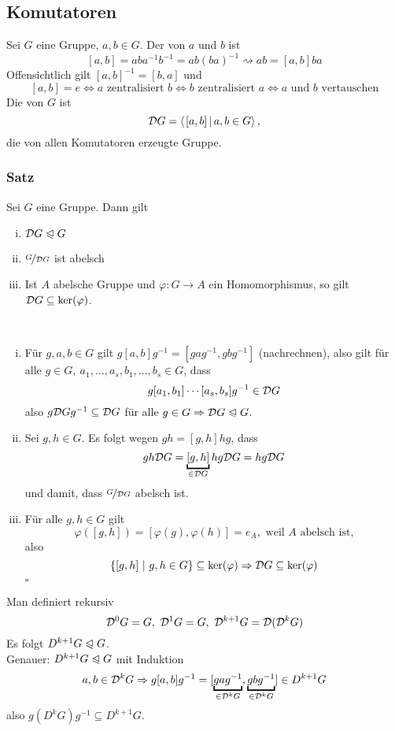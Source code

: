 \subsection{Komutatoren}
\label{sub:komutatoren}
Sei $G$ eine Gruppe, $a,b\in G$. 
Der  von $a$ und $b$ ist 
\[ 
[a,b]=aba^{-1}b^{-1}=ab(ba)^{-1}\rightsquigarrow ab=[a,b]ba
\]
Offensichtlich gilt $[a,b]^{-1}=[b,a]$ und 
\[
[a,b]=e\Leftrightarrow a\text{ zentralisiert }b\Leftrightarrow b\text{ zentralisiert }a\Leftrightarrow a\text{ und }b\text{ vertauschen}
\]
Die  von $G$ ist
\[
\D G=\sprod{[a,b]}{a,b\in G},
\]
die von allen Komutatoren erzeugte Gruppe.

\subsubsection*{Satz}
Sei $G$ eine Gruppe. 
Dann gilt
\begin{enumerate}[(i)]
	\item $\mathcal{D} G\trianglelefteqslant G$
	\item $\nicefrac{G}{\mathcal{D} G}$ ist abelsch
	\item Ist $A$ abelsche Gruppe und $\varphi:G\to A$ ein Homomorphismus, so gilt $\mathcal{D} G\subseteq \ker(\varphi)$.
\end{enumerate}

\\
\begin{enumerate}[(i)]
	\item Für $g,a,b \in G$ gilt $g[a,b]g^{-1}=[gag^{-1},gbg^{-1}]$ (nachrechnen), also gilt für alle $g\in G,~a_1,\dots,a_s,b_1,\dots,b_s\in G$, dass
	\[
	g[a_1,b_1]\cdots[a_s,b_s]g^{-1}\in \mathcal{D} G
	\]
	also $g\mathcal{D} G g^{-1}\subseteq \mathcal{D} G$ für alle $g\in G\Rightarrow \mathcal{D} G\trianglelefteqslant G$.
	\item Sei $g,h\in G$. 
	Es folgt wegen $gh=[g,h]hg$, dass
	\[
	gh\D G=\underbracket{[g,h]}_{\in \D G}hg \D G=hg\D G
	\]
	und damit, dass $\nicefrac{G}{\mathcal{D} G}$ abelsch ist.
	\item Für alle $g,h\in G$ gilt
	\[
	\varphi([g,h])=[\varphi(g),\varphi(h)]=e_A, \text{ weil $A$ abelsch ist,}
	\]
	also 
	\[
	\{[g,h]~|~g,h\in G \}\subseteq \ker(\varphi)\Rightarrow\mathcal{D} G\subseteq \ker(\varphi)
	\]
	\hfill $\square$
\end{enumerate}
Man definiert rekursiv
\[
\mathcal{D}^0 G=G,~\mathcal{D}^1 G=G,~\mathcal{D}^{k+1}G=\mathcal{D}(\mathcal{D}^kG)
\]
Es folgt $D^{k+1}G\trianglelefteqslant G$.\\
Genauer: $D^{k+1}G\trianglelefteqslant G$ mit Induktion
\[
a,b\in \D^kG\Rightarrow g[a,b]g^{-1}=[\underbracket{gag^{-1}}_{\in \D^kG},\underbracket{gbg^{-1}}_{\in \D^kG}]\in D^{k+1}G
\]
also $g(D^{k}G)g^{-1}\subseteq D^{k+1}G$.

